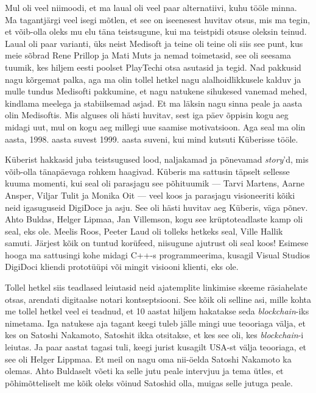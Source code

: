 Mul oli veel niimoodi, et ma laual oli veel paar alternatiivi,  kuhu tööle minna. Ma tagantjärgi veel isegi mõtlen, et see on iseenesest huvitav otsus, mis ma tegin, et võib-olla oleks mu elu täna teistsugune, kui ma teistpidi otsuse oleksin teinud. Laual oli paar varianti, üks neist Medisoft ja teine oli teine oli siis see punt, kus meie sõbrad Rene Prillop ja Mati Muts ja nemad toimetasid, see oli seesama tuumik, kes hiljem eesti poolset PlayTechi otsa  asutasid ja tegid. Nad pakkusid nagu kõrgemat palka, aga ma olin tollel hetkel nagu alalhoidlikkusele kalduv ja mulle tundus Medisofti pakkumine, et nagu natukene sihukesed vanemad mehed, kindlama meelega ja stabiilsemad asjad. Et ma läksin nagu sinna peale ja aasta olin Medisoftis. Mis alguses oli hästi huvitav, sest iga päev õppisin kogu aeg midagi uut, mul on kogu aeg millegi uue saamise motivatsioon.  Aga seal ma olin aasta, 1998. aasta suvest 1999. aasta suveni, kui mind kutsuti Küberisse tööle. 

Küberist hakkasid juba teistsugused lood, naljakamad ja põnevamad \emph{story}'d, mis võib-olla tänapäevaga rohkem haagivad. Küberis ma sattusin täpselt sellesse kuuma momenti, kui seal oli parasjagu see põhituumik --- Tarvi Martens, Aarne Ansper, Viljar Tulit ja Monika Oit --- veel koos ja parasjagu visioneeriti kõiki neid igasuguseid DigiDoce ja asju. See oli hästi huvitav aeg Küberis, väga põnev. Ahto Buldas, Helger Lipmaa, Jan Villemson, kogu see krüptoteadlaste kamp oli seal, eks ole. Meelis Roos,  Peeter Laud oli tolleks hetkeks seal, Ville Hallik samuti. Järjest kõik on tuntud  korüfeed, niisugune ajutrust oli seal koos! Esimese hooga ma sattusingi kohe midagi C++-s programmeerima, kusagil Visual Studios DigiDoci kliendi prototüüpi või mingit visiooni klienti, eks ole. 

Tollel hetkel siis teadlased leiutasid neid ajatemplite linkimise skeeme räsiahelate otsas, arendati digitaalse notari kontseptsiooni. See kõik oli selline asi, mille kohta me tollel hetkel veel ei teadnud, et 10 aastat hiljem hakatakse seda \emph{blockchain}-iks nimetama. Iga natukese aja tagant keegi tuleb jälle mingi uue teooriaga välja, et kes on Satoshi Nakamoto, Satoshit ikka otsitakse, et kes see oli, kes \emph{blockchain}-i leiutas. Ja paar aastat tagasi tuli, keegi jurist kusagilt USA-st välja teooriaga, et see oli Helger Lippmaa. Et meil on nagu oma nii-öelda Satoshi Nakamoto ka olemas. Ahto Buldaselt võeti ka selle jutu peale intervjuu ja tema ütles, et põhimõtteliselt me kõik oleks võinud Satoshid olla, muigas selle jutuga peale. 

